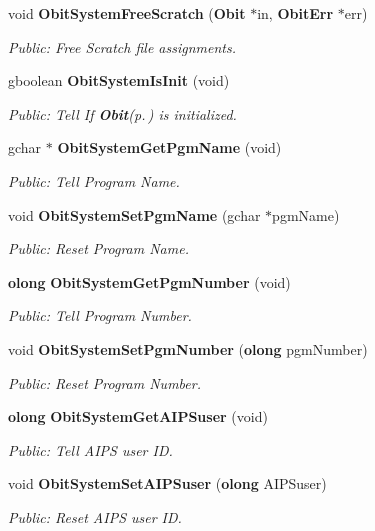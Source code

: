 \begin{CompactItemize}
void {\bf Obit\-System\-Free\-Scratch} ({\bf Obit} $\ast$in, {\bf Obit\-Err} $\ast$err)
\begin{CompactList}\small\item\em Public: Free Scratch file assignments. \item\end{CompactList}\item 
gboolean {\bf Obit\-System\-Is\-Init} (void)
\begin{CompactList}\small\item\em Public: Tell If {\bf Obit}{\rm (p.\,\pageref{structObit})} is initialized. \item\end{CompactList}\item 
gchar $\ast$ {\bf Obit\-System\-Get\-Pgm\-Name} (void)
\begin{CompactList}\small\item\em Public: Tell Program Name. \item\end{CompactList}\item 
void {\bf Obit\-System\-Set\-Pgm\-Name} (gchar $\ast$pgm\-Name)
\begin{CompactList}\small\item\em Public: Reset Program Name. \item\end{CompactList}\item 
{\bf olong} {\bf Obit\-System\-Get\-Pgm\-Number} (void)
\begin{CompactList}\small\item\em Public: Tell Program Number. \item\end{CompactList}\item 
void {\bf Obit\-System\-Set\-Pgm\-Number} ({\bf olong} pgm\-Number)
\begin{CompactList}\small\item\em Public: Reset Program Number. \item\end{CompactList}\item 
{\bf olong} {\bf Obit\-System\-Get\-AIPSuser} (void)
\begin{CompactList}\small\item\em Public: Tell AIPS user ID. \item\end{CompactList}\item 
void {\bf Obit\-System\-Set\-AIPSuser} ({\bf olong} AIPSuser)
\begin{CompactList}\small\item\em Public: Reset AIPS user ID. \item\end{CompactList}\end{CompactItemize}


